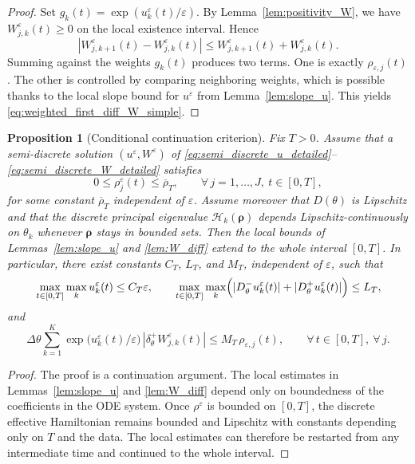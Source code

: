 \documentclass[11pt,a4paper]{ctexart}
\newtheorem{proposition}{Proposition}[section]
\begin{document}
\begin{proof}
Set \(g_k(t)=\exp(u_k^\varepsilon(t)/\varepsilon)\). By Lemma~\ref{lem:positivity_W}, we have \(W_{j,k}^\varepsilon(t)\ge0\) on the local existence interval. Hence
\[
|W_{j,k+1}^\varepsilon(t)-W_{j,k}^\varepsilon(t)|
\le W_{j,k+1}^\varepsilon(t)+W_{j,k}^\varepsilon(t).
\]
Summing against the weights \(g_k(t)\) produces two terms. One is exactly \(\rho_{\varepsilon,j}(t)\). The other is controlled by comparing neighboring weights, which is possible thanks to the local slope bound for \(u^\varepsilon\) from Lemma~\ref{lem:slope_u}. This yields \eqref{eq:weighted_first_diff_W_simple}.
\end{proof}



\begin{proposition}[Conditional continuation criterion]\label{prop:conditional_cont}
Fix \(T>0\). Assume that a semi-discrete solution \((u^\varepsilon,W^\varepsilon)\) of \eqref{eq:semi_discrete_u_detailed}--\eqref{eq:semi_discrete_W_detailed} satisfies
\[
0\le \rho_j^\varepsilon(t)\le \overline\rho_T,
\qquad
\forall\,j=1,\dots,J,\ t\in[0,T],
\]
for some constant \(\overline\rho_T\) independent of \(\varepsilon\). Assume moreover that \(D(\theta)\) is Lipschitz and that the discrete principal eigenvalue \(\mathcal H_k(\boldsymbol\rho)\) depends Lipschitz-continuously on \(\theta_k\) whenever \(\boldsymbol\rho\) stays in bounded sets. Then the local bounds of Lemmas~\ref{lem:slope_u} and \ref{lem:W_diff} extend to the whole interval \([0,T]\). In particular, there exist constants \(C_T\), \(L_T\), and \(M_T\), independent of \(\varepsilon\), such that
\[
\max_{t\in[0,T]}\max_k u_k^\varepsilon(t)\le C_T\varepsilon,
\qquad
\max_{t\in[0,T]}\max_k\Bigl(|D_\theta^-u_k^\varepsilon(t)|+|D_\theta^+u_k^\varepsilon(t)|\Bigr)\le L_T,
\]
and
\[
\Delta\theta\sum_{k=1}^K
\exp\!\bigl(u_k^\varepsilon(t)/\varepsilon\bigr)\,|\delta_\theta^+ W_{j,k}^\varepsilon(t)|
\le M_T\,\rho_{\varepsilon,j}(t),
\qquad \forall\,t\in[0,T],\ \forall\,j.
\]
\end{proposition}

\begin{proof}
The proof is a continuation argument. The local estimates in Lemmas~\ref{lem:slope_u} and \ref{lem:W_diff} depend only on boundedness of the coefficients in the ODE system. Once \(\rho^\varepsilon\) is bounded on \([0,T]\), the discrete effective Hamiltonian remains bounded and Lipschitz with constants depending only on \(T\) and the data. The local estimates can therefore be restarted from any intermediate time and continued to the whole interval.
\end{proof}
\end{document}
